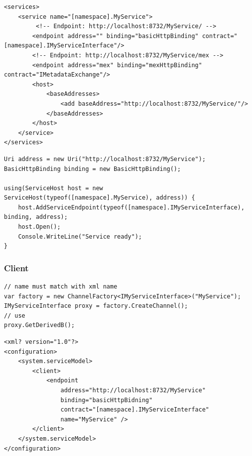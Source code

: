 \documentclass[
a4paper,
oneside,
10pt,
fleqn,
headsepline,
toc=listofnumbered, 
bibliography=totocnumbered]{scrartcl}
\begin{document}
\begin{lstlisting}[caption=Service Hosting via XML]
<services>
	<service name="[namespace].MyService">
		 <!-- Endpoint: http://localhost:8732/MyService/ -->
		<endpoint address="" binding="basicHttpBinding" contract="[namespace].IMyServiceInterface"/>
		<!-- Endpoint: http://localhost:8732/MyService/mex -->
		<endpoint address="mex" binding="mexHttpBinding"  contract="IMetadataExchange"/> 
		<host>
			<baseAddresses>
				<add baseAddress="http://localhost:8732/MyService/"/>
			</baseAddresses>
		</host>
	</service>
</services>
\end{lstlisting}

\clearpage

\begin{lstlisting}[caption=Service Hosting via Code]
Uri address = new Uri("http://localhost:8732/MyService");
BasicHttpBinding binding = new BasicHttpBinding();

using(ServiceHost host = new ServiceHost(typeof([namespace].MyService), address)) {
	host.AddServiceEndpoint(typeof([namespace].IMyServiceInterface), binding, address);
	host.Open();
	Console.WriteLine("Service ready");
}
\end{lstlisting}

\subsubsection{Client}
\begin{lstlisting}
// name must match with xml name
var factory = new ChannelFactory<IMyServiceInterface>("MyService");
IMyServiceInterface proxy = factory.CreateChannel();
// use
proxy.GetDerivedB();
\end{lstlisting}

\begin{lstlisting}
<xml? version="1.0"?>
<configuration>
	<system.serviceModel>
		<client>
			<endpoint
				address="http://localhost:8732/MyService"
				binding="basicHttpBidning"
				contract="[namespace].IMyServiceInterface"
				name="MyService" />
		</client>
	</system.serviceModel>
</configuration>
\end{lstlisting}
\end{document}
